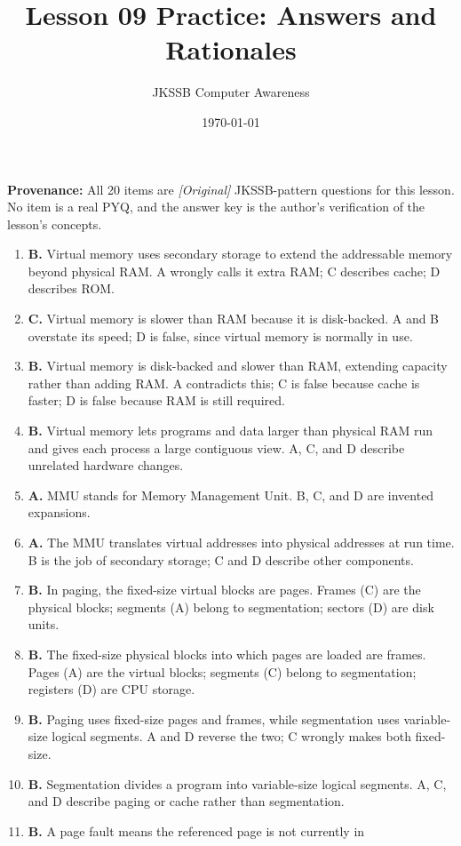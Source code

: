 \documentclass[11pt]{article}
\title{Lesson 09 Practice: Answers and Rationales}
\author{JKSSB Computer Awareness}
\date{\today}
\begin{document}
\maketitle
\noindent\textbf{Provenance:} All 20 items are \textit{[Original]}
JKSSB-pattern questions for this lesson. No item is a real PYQ, and the
answer key is the author's verification of the lesson's concepts.
\begin{enumerate}[label=\textbf{Q\arabic*.}, leftmargin=*]
\item \textbf{B.} Virtual memory uses secondary storage to extend the
  addressable memory beyond physical RAM. A wrongly calls it extra RAM; C
  describes cache; D describes ROM.
\item \textbf{C.} Virtual memory is slower than RAM because it is disk-backed.
  A and B overstate its speed; D is false, since virtual memory is normally in
  use.
\item \textbf{B.} Virtual memory is disk-backed and slower than RAM, extending
  capacity rather than adding RAM. A contradicts this; C is false because cache
  is faster; D is false because RAM is still required.
\item \textbf{B.} Virtual memory lets programs and data larger than physical
  RAM run and gives each process a large contiguous view. A, C, and D describe
  unrelated hardware changes.
\item \textbf{A.} MMU stands for Memory Management Unit. B, C, and D are
  invented expansions.
\item \textbf{A.} The MMU translates virtual addresses into physical addresses
  at run time. B is the job of secondary storage; C and D describe other
  components.
\item \textbf{B.} In paging, the fixed-size virtual blocks are pages. Frames
  (C) are the physical blocks; segments (A) belong to segmentation; sectors (D)
  are disk units.
\item \textbf{B.} The fixed-size physical blocks into which pages are loaded
  are frames. Pages (A) are the virtual blocks; segments (C) belong to
  segmentation; registers (D) are CPU storage.
\item \textbf{B.} Paging uses fixed-size pages and frames, while segmentation
  uses variable-size logical segments. A and D reverse the two; C wrongly makes
  both fixed-size.
\item \textbf{B.} Segmentation divides a program into variable-size logical
  segments. A, C, and D describe paging or cache rather than segmentation.
\item \textbf{B.} A page fault means the referenced page is not currently in

\end{enumerate}
\end{document}
